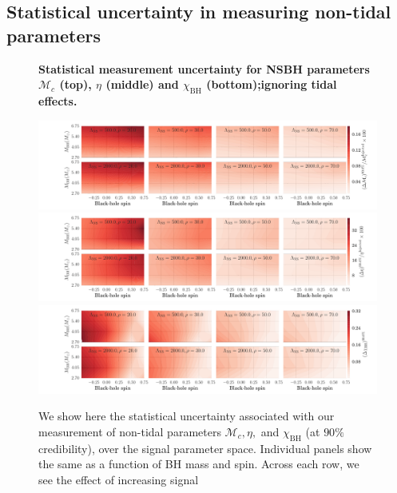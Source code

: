 \documentclass[aps,prd,amsmath,floats,floatfix, twocolumn,
superscriptaddress,nofootinbib,showpacs]{revtex4-1}
\newcommand{\chibh}{\chi_\mathrm{BH}}
\newcommand{\mchirp}{\mathcal{M}_c}
\begin{document}
\begin{appendix}

\section{Statistical uncertainty in measuring non-tidal parameters}\label{as1:nontidalerrors}
% 
\begin{figure}
\centering 
\textbf{Statistical measurement uncertainty for NSBH parameters $\mchirp$ (top),
$\eta$ (middle) and $\chibh$ (bottom);\newline ignoring tidal effects.}\par\medskip
\includegraphics[trim = {2cm 0 0 0},width=2.\columnwidth]{plots/TNMchirpCIWidths90_0_Lambda_SNR}\\
\includegraphics[trim = {2cm 0 0 0},width=2.\columnwidth]{plots/TNEtaCIWidths90_0_Lambda_SNR}\\
\includegraphics[trim = {2cm 0 0 0},width=2.\columnwidth]{plots/TNChiBHCIWidths90_0_Lambda_SNR}
\caption{
We show here the statistical uncertainty associated with our measurement of
non-tidal parameters $\mchirp, \eta,$ and $\chibh$ (at $90\%$ credibility),
over the signal parameter space. Individual panels show the same as a function
of BH mass and spin. Across each row, we see the effect of increasing signal
}
\end{figure}
\end{appendix}
\end{document}
